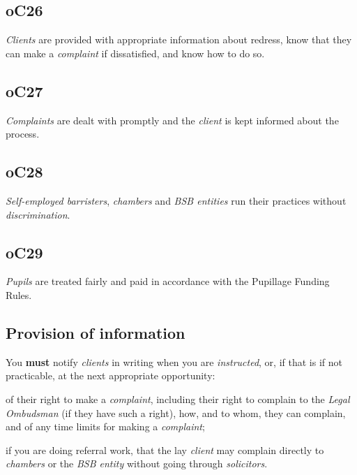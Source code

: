 

\subsection{\color{bleu}oC26}

\emph{Clients} are provided with appropriate information about redress,
know that they can make a \emph{complaint} if dissatisfied, and know how
to do so.~

\subsection{\color{bleu}oC27}

\emph{Complaints} are dealt with promptly and the \emph{client} is kept
informed about the process.

\subsection{\color{bleu}oC28}

\emph{Self-employed barristers}, \emph{chambers} and \emph{BSB entities}
run their practices without \emph{discrimination}.

\subsection{\color{bleu}oC29}

\emph{Pupils} are treated fairly and paid in accordance with the
Pupillage Funding Rules.



\subsection{Provision of information}


You \textcolor{myred}{\textbf{must}} notify \emph{clients} in writing when you are
\emph{instructed}, or, if that is if not practicable, at the next
appropriate opportunity:
\begin{numlist}\item of their right to make a \emph{complaint}, including their right to
complain to the \emph{Legal Ombudsman} (if they have such a right), how,
and to whom, they can complain, and of any time limits for making a
\emph{complaint};
\item if you are doing referral work, that the lay \emph{client} may
complain directly to \emph{chambers} or the \emph{BSB entity} without
going through \emph{solicitors}.
\end{numlist}

